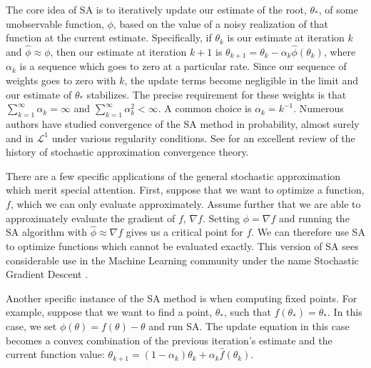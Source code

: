 \documentclass[11pt, oneside]{article}   	%
\begin{document}
The core idea of SA is to iteratively update our estimate of the root, $\theta_*$, of some unobservable function, $\phi$, based on the value of a noisy realization of that function at the current estimate. Specifically, if $\theta_k$ is our estimate at iteration $k$ and $\hat{\phi} \approx \phi$, then our estimate at iteration $k+1$ is $\theta_{k+1} = \theta_k - \alpha_k \hat{\phi}(\theta_k)$, where $\alpha_k$ is a sequence which goes to zero at a particular rate. Since our sequence of weights goes to zero with $k$, the update terms become negligible in the limit and our estimate of $\theta_*$ stabilizes. The precise requirement for these weights is that $\sum_{k=1}^\infty \alpha_k = \infty$ and $\sum_{k=1}^\infty \alpha_k^2 < \infty$. A common choice is $\alpha_k = k^{-1}$. Numerous authors have studied convergence of the SA method in probability, almost surely and in $\mathcal{L}^1$ under various regularity conditions. See \citet{Lai03} for an excellent review of the history of stochastic approximation convergence theory.

There are a few specific applications of the general stochastic approximation which merit special attention. First, suppose that we want to optimize a function, $f$, which we can only evaluate approximately. Assume further that we are able to approximately evaluate the gradient of $f$, $\nabla f$. Setting $\phi = \nabla f$ and running the SA algorithm with $\hat{\phi} \approx \nabla f$ gives us a critical point for $f$. We can therefore use SA to optimize functions which cannot be evaluated exactly. This version of SA sees considerable use in the Machine Learning community under the name Stochastic Gradient Descent \citep{Bot10}.

Another specific instance of the SA method is when computing fixed points. For example, suppose that we want to find a point, $\theta_*$, such that $f(\theta_*) = \theta_*$. In this case, we set $\phi(\theta) = f(\theta) - \theta$ and run SA. The update equation in this case becomes a convex combination of the previous iteration's estimate and the current function value: $\theta_{k+1} = (1 - \alpha_k) \theta_k + \alpha_k \hat{f}(\theta_k)$. 
\end{document}
